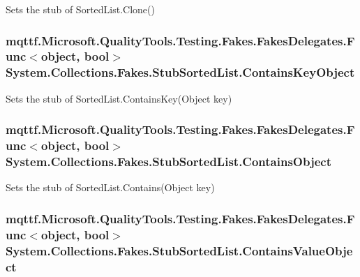 Sets the stub of Sorted\-List.\-Clone()

\hypertarget{class_system_1_1_collections_1_1_fakes_1_1_stub_sorted_list_aeca6eb2e65b6cbf18333bae98fec0a72}{
\subsubsection[{Contains\-Key\-Object}]{\setlength{\rightskip}{0pt plus 5cm}mqttf.\-Microsoft.\-Quality\-Tools.\-Testing.\-Fakes.\-Fakes\-Delegates.\-Func$<$object, bool$>$ System.\-Collections.\-Fakes.\-Stub\-Sorted\-List.\-Contains\-Key\-Object}}\label{class_system_1_1_collections_1_1_fakes_1_1_stub_sorted_list_aeca6eb2e65b6cbf18333bae98fec0a72}


Sets the stub of Sorted\-List.\-Contains\-Key(\-Object key)

\hypertarget{class_system_1_1_collections_1_1_fakes_1_1_stub_sorted_list_a60b28df9e07f719f5cef752741bad22a}{
\subsubsection[{Contains\-Object}]{\setlength{\rightskip}{0pt plus 5cm}mqttf.\-Microsoft.\-Quality\-Tools.\-Testing.\-Fakes.\-Fakes\-Delegates.\-Func$<$object, bool$>$ System.\-Collections.\-Fakes.\-Stub\-Sorted\-List.\-Contains\-Object}}\label{class_system_1_1_collections_1_1_fakes_1_1_stub_sorted_list_a60b28df9e07f719f5cef752741bad22a}


Sets the stub of Sorted\-List.\-Contains(\-Object key)

\hypertarget{class_system_1_1_collections_1_1_fakes_1_1_stub_sorted_list_a29613e958a42b1f21c851eaa27779b13}{
\subsubsection[{Contains\-Value\-Object}]{\setlength{\rightskip}{0pt plus 5cm}mqttf.\-Microsoft.\-Quality\-Tools.\-Testing.\-Fakes.\-Fakes\-Delegates.\-Func$<$object, bool$>$ System.\-Collections.\-Fakes.\-Stub\-Sorted\-List.\-Contains\-Value\-Object}}\label{class_system_1_1_collections_1_1_fakes_1_1_stub_sorted_list_a29613e958a42b1f21c851eaa27779b13}


